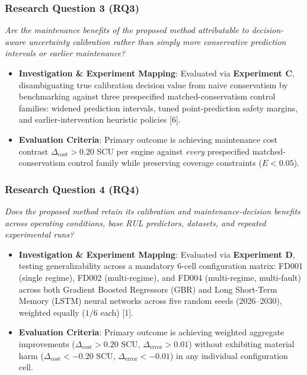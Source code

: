 \documentclass[12pt,a4paper]{article}
\begin{document}
\subsubsection*{Research Question 3 (RQ3)}
\textit{Are the maintenance benefits of the proposed method attributable to decision-aware uncertainty calibration rather than simply more conservative prediction intervals or earlier maintenance?}
\begin{itemize}
    \item \textbf{Investigation \& Experiment Mapping}: Evaluated via \textbf{Experiment C}, disambiguating true calibration decision value from naive conservatism by benchmarking against three prespecified matched-conservatism control families: widened prediction intervals, tuned point-prediction safety margins, and earlier-intervention heuristic policies [6].
    \item \textbf{Evaluation Criteria}: Primary outcome is achieving maintenance cost contrast $\Delta_{\text{cost}} > 0.20$ SCU per engine against \textit{every} prespecified matched-conservatism control family while preserving coverage constraints ($E < 0.05$).
\end{itemize}

\subsubsection*{Research Question 4 (RQ4)}
\textit{Does the proposed method retain its calibration and maintenance-decision benefits across operating conditions, base RUL predictors, datasets, and repeated experimental runs?}
\begin{itemize}
    \item \textbf{Investigation \& Experiment Mapping}: Evaluated via \textbf{Experiment D}, testing generalizability across a mandatory 6-cell configuration matrix: FD001 (single regime), FD002 (multi-regime), and FD004 (multi-regime, multi-fault) across both Gradient Boosted Regressors (GBR) and Long Short-Term Memory (LSTM) neural networks across five random seeds (2026--2030), weighted equally ($1/6$ each) [1].
    \item \textbf{Evaluation Criteria}: Primary outcome is achieving weighted aggregate improvements ($\Delta_{\text{cost}} > 0.20$ SCU, $\Delta_{\text{error}} > 0.01$) without exhibiting material harm ($\Delta_{\text{cost}} < -0.20$ SCU, $\Delta_{\text{error}} < -0.01$) in any individual configuration cell.
\end{itemize}
\end{document}
